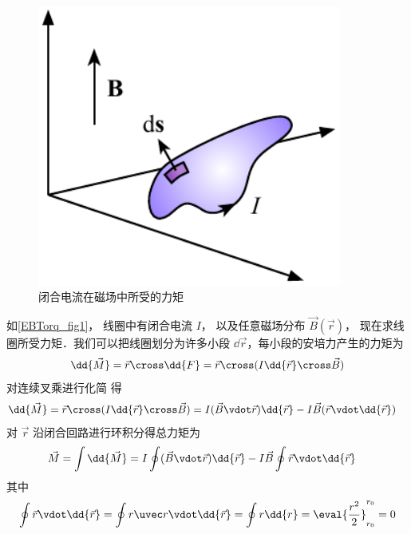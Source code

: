 
\begin{figure}[ht]
\centering
\includegraphics[width=10cm]{./figures/EBTorq.pdf}
\caption{闭合电流在磁场中所受的力矩} \label{EBTorq_fig1}
\end{figure}
如\autoref{EBTorq_fig1}， 线圈中有闭合电流 $I$， 以及任意磁场分布 $\vec B(\vec r)$， 现在求线圈所受力矩．我们可以把线圈划分为许多小段 $\dd{\vec r}$，每小段的安培力产生的力矩为
\begin{equation}
\dd{\vec M} = \vec r\cross \dd{F} = \vec r \cross (I \dd{\vec r} \cross \vec B)
\end{equation}
对连续叉乘进行化简 得
\begin{equation}
\begin{aligned}
\dd{\vec M} &=  \vec r \cross (I\dd{\vec r} \cross \vec B) =  I (\vec B \vdot \vec r) \dd{\vec r}  -  I\vec B (\vec r \vdot \dd{\vec r})
\end{aligned}
\end{equation}
对 $\vec r$ 沿闭合回路进行环积分得总力矩为
\begin{equation}
\begin{aligned}
\vec M & = \int \dd{\vec M} = I\oint (\vec B\vdot\vec r)\dd{\vec r}  - I\vec B\oint \vec r \vdot \dd{\vec r}
\end{aligned}
\end{equation}
其中
\begin{equation}
\oint \vec r \vdot \dd{\vec r}  = \oint r \uvec r \vdot \dd{\vec r}  = \oint r \dd{r}  = \eval{\frac{r^2}{2}}_{r_0}^{r_0}  = 0 %
\end{equation}
